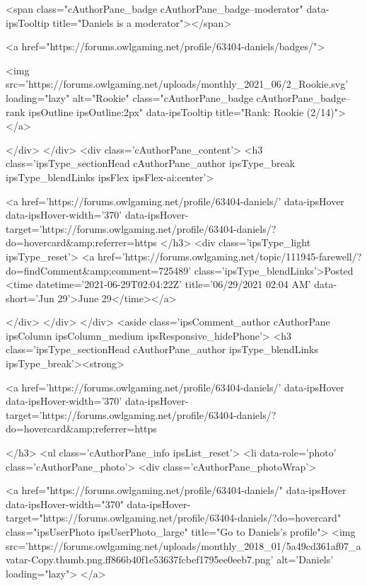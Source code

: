 				
				<span class="cAuthorPane_badge cAuthorPane_badge--moderator" data-ipsTooltip title="Daniels is a moderator"></span>
				
				
					<a href="https://forums.owlgaming.net/profile/63404-daniels/badges/">
						
<img src='https://forums.owlgaming.net/uploads/monthly_2021_06/2_Rookie.svg' loading="lazy" alt="Rookie" class="cAuthorPane_badge cAuthorPane_badge--rank ipsOutline ipsOutline:2px" data-ipsTooltip title="Rank: Rookie (2/14)">
					</a>
				
			</div>
		</div>
		<div class='cAuthorPane_content'>
			<h3 class='ipsType_sectionHead cAuthorPane_author ipsType_break ipsType_blendLinks ipsFlex ipsFlex-ai:center'>
				


<a href='https://forums.owlgaming.net/profile/63404-daniels/' data-ipsHover data-ipsHover-width='370' data-ipsHover-target='https://forums.owlgaming.net/profile/63404-daniels/?do=hovercard&amp;referrer=https%
			</h3>
			<div class='ipsType_light ipsType_reset'>
				<a href='https://forums.owlgaming.net/topic/111945-farewell/?do=findComment&amp;comment=725489' class='ipsType_blendLinks'>Posted <time datetime='2021-06-29T02:04:22Z' title='06/29/2021 02:04  AM' data-short='Jun 29'>June 29</time></a>
				
			</div>
		</div>
	</div>
	<aside class='ipsComment_author cAuthorPane ipsColumn ipsColumn_medium ipsResponsive_hidePhone'>
		<h3 class='ipsType_sectionHead cAuthorPane_author ipsType_blendLinks ipsType_break'><strong>


<a href='https://forums.owlgaming.net/profile/63404-daniels/' data-ipsHover data-ipsHover-width='370' data-ipsHover-target='https://forums.owlgaming.net/profile/63404-daniels/?do=hovercard&amp;referrer=https%
			
		</h3>
		<ul class='cAuthorPane_info ipsList_reset'>
			<li data-role='photo' class='cAuthorPane_photo'>
				<div class='cAuthorPane_photoWrap'>
					


	<a href="https://forums.owlgaming.net/profile/63404-daniels/" data-ipsHover data-ipsHover-width="370" data-ipsHover-target="https://forums.owlgaming.net/profile/63404-daniels/?do=hovercard" class="ipsUserPhoto ipsUserPhoto_large" title="Go to Daniels's profile">
		<img src='https://forums.owlgaming.net/uploads/monthly_2018_01/5a49cd361af07_avatar-Copy.thumb.png.ff866b40f1e53637fcbef1795ee0eeb7.png' alt='Daniels' loading="lazy">
	</a>

